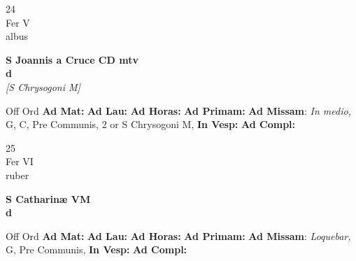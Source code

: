 \documentclass[10pt, openany]{book}
\begin{document}
        \begin{center}
            \begin{minipage}{3.5in}
                \vspace{2em}
                \begin{minipage}{0.5in}
                    {\Huge 24} \\
                    {\normalsize Fer V} \\
                    {\normalsize albus}
                \end{minipage}
                \begin{minipage}{3.0in}
                    \textbf{ \large S Joannis a Cruce CD mtv \\
                    \textnormal{\normalsize d}} \\ \textit{[S Chrysogoni M]} \\ 
                \end{minipage}
                \begin{justify}Off Ord
                    \textbf{Ad Mat: }
                    \textbf{Ad Lau: }
                    \textbf{Ad Horas: }
                    \textbf{Ad Primam: }\textbf{Ad Missam}: \textit{In medio,} G, C, Pre Communis, 2 or S Chrysogoni M,  
                    \textbf{In Vesp: }
                    \textbf{Ad Compl: }
                \end{justify}
            \end{minipage}
        \end{center}
    
        \begin{center}
            \begin{minipage}{3.5in}
                \vspace{2em}
                \begin{minipage}{0.5in}
                    {\Huge 25} \\
                    {\normalsize Fer VI} \\
                    {\normalsize ruber}
                \end{minipage}
                \begin{minipage}{3.0in}
                    \textbf{ \large S Catharinæ VM \\
                    \textnormal{\normalsize d}} \\ 
                \end{minipage}
                \begin{justify}Off Ord
                    \textbf{Ad Mat: }
                    \textbf{Ad Lau: }
                    \textbf{Ad Horas: }
                    \textbf{Ad Primam: }\textbf{Ad Missam}: \textit{Loquebar,} G, Pre Communis,  
                    \textbf{In Vesp: }
                    \textbf{Ad Compl: }
                \end{justify}
            \end{minipage}
        \end{center}
    
\end{document}
